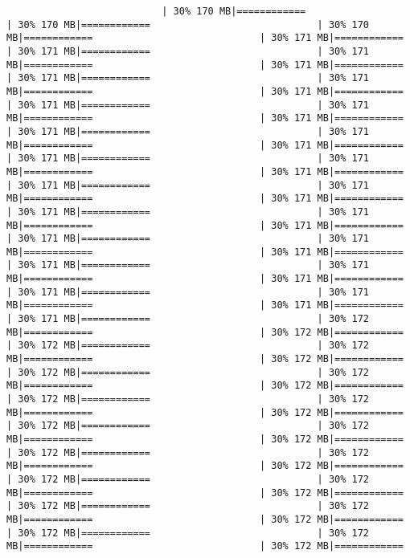 \documentclass[
]{article}
\begin{document}
\begin{verbatim}
                           | 30% 170 MB|============                             | 30% 170 MB|============                             | 30% 170 MB|============                             | 30% 171 MB|============                             | 30% 171 MB|============                             | 30% 171 MB|============                             | 30% 171 MB|============                             | 30% 171 MB|============                             | 30% 171 MB|============                             | 30% 171 MB|============                             | 30% 171 MB|============                             | 30% 171 MB|============                             | 30% 171 MB|============                             | 30% 171 MB|============                             | 30% 171 MB|============                             | 30% 171 MB|============                             | 30% 171 MB|============                             | 30% 171 MB|============                             | 30% 171 MB|============                             | 30% 171 MB|============                             | 30% 171 MB|============                             | 30% 171 MB|============                             | 30% 171 MB|============                             | 30% 171 MB|============                             | 30% 171 MB|============                             | 30% 171 MB|============                             | 30% 171 MB|============                             | 30% 171 MB|============                             | 30% 171 MB|============                             | 30% 171 MB|============                             | 30% 171 MB|============                             | 30% 171 MB|============                             | 30% 171 MB|============                             | 30% 171 MB|============                             | 30% 171 MB|============                             | 30% 172 MB|============                             | 30% 172 MB|============                             | 30% 172 MB|============                             | 30% 172 MB|============                             | 30% 172 MB|============                             | 30% 172 MB|============                             | 30% 172 MB|============                             | 30% 172 MB|============                             | 30% 172 MB|============                             | 30% 172 MB|============                             | 30% 172 MB|============                             | 30% 172 MB|============                             | 30% 172 MB|============                             | 30% 172 MB|============                             | 30% 172 MB|============                             | 30% 172 MB|============                             | 30% 172 MB|============                             | 30% 172 MB|============                             | 30% 172 MB|============                             | 30% 172 MB|============                             | 30% 172 MB|============                             | 30% 172 MB|============                             | 30% 172 MB|============                             | 30% 172 MB|============                             | 30% 172 MB|============                             | 30% 172 MB|============                           
\end{verbatim}
\end{document}
